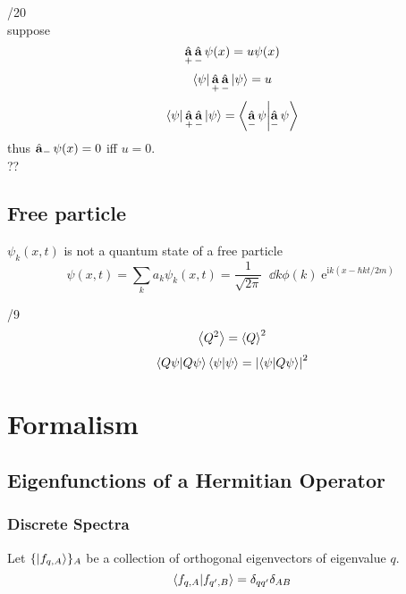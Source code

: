 \documentclass[UTF8]{ctexart} %
\DeclareMathOperator{\intdinf}{\int_{-\infty}^\infty}
\DeclareMathOperator{\e}{\mathrm{e}}
\renewcommand{\I}{\mathrm{i}}
\DeclareMathOperator{\ha}{\hat{\vb{a}}}
\numberwithin{equation}{subsection}
\begin{document}
/20\\
suppose
\begin{equation}\label{key}
\ha_+\ha_- \psi(x) = u\psi(x)
\end{equation}
\begin{equation}\label{key}
\bra{\psi}\ha_+\ha_-\ket{\psi} = u
\end{equation}
\begin{equation}\label{key}
\bra{\psi}\ha_+\ha_-\ket{\psi} = \braket{\ha_-\psi}{\ha_-\psi}
\end{equation}
thus $ \ha_-\psi(x) = 0 $ iff $ u = 0 $.\\
??\\

\subsection{Free particle}
$ \psi_k(x,t) $ is not a quantum state of a free particle
\begin{equation}\label{key}
\psi(x,t) = \sum_k a_k\psi_k(x,t)
= \dfrac{1}{\sqrt{2\pi}}\intdinf \dd k \phi(k)\e^{\I k(x - \hbar kt/2m)}
\end{equation}

/9\\
\begin{equation}\label{key}
\expval{Q^2} = \expval{Q}^2
\end{equation}
\begin{equation}\label{key}
\bra{Q\psi}\ket{Q\psi} \bra{\psi}\ket{\psi} = \abs{\bra{\psi}\ket{Q\psi}}^2
\end{equation}

\section{Formalism}
\subsection{}
\subsection{}
\subsection{Eigenfunctions of a Hermitian Operator}
\subsubsection{Discrete Spectra}
Let $ \{\ket{f_{q,A}}\}_A $ be a collection of orthogonal eigenvectors of eigenvalue $ q $.
\begin{equation}\label{key}
\bra{f_{q,A}}\ket{f_{q',B}} = \delta_{qq'}\delta_{AB}
\end{equation}
\end{document}
